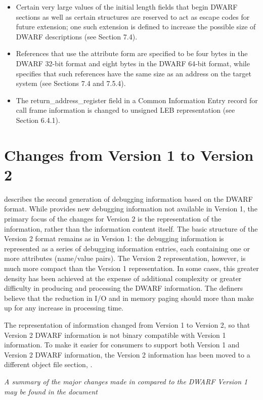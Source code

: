 \begin{itemize}
\item
Certain very large values of the initial length fields that
begin DWARF sections as well as certain structures are reserved
to act as escape codes for future extension; one such extension
is defined to increase the possible size of DWARF descriptions
(see Section 7.4).

\item
References that use the attribute form 
are specified to be four bytes in the DWARF 32-bit format and
eight bytes in the DWARF 64-bit format, while 
specifies that such references have the same size as an
address on the target system (see Sections 7.4 and 7.5.4).

\item
The return\_address\_register field in a Common Information
Entry record for call frame information is changed to unsigned
LEB representation (see Section 6.4.1).

\end{itemize}


\section[Changes Version1 to 2]{Changes from Version 1 to Version 2}
describes the second generation of debugging
information based on the DWARF format. While 
provides new debugging information not available in
Version 1, the primary focus of the changes for Version
2 is the representation of the information, rather than
the information content itself. The basic structure of
the Version 2 format remains as in Version 1: the debugging
information is represented as a series of debugging information
entries, each containing one or more attributes (name/value
pairs). The Version 2 representation, however, is much more
compact than the Version 1 representation. In some cases,
this greater density has been achieved at the expense of
additional complexity or greater difficulty in producing and
processing the DWARF information. The definers believe that the
reduction in I/O and in memory paging should more than make
up for any increase in processing time.  

The representation
of information changed from Version 1 to Version 2, so that
Version 2 DWARF information is not binary compatible with
Version 1 information. To make it easier for consumers to
support both Version 1 and Version 2 DWARF information, the
Version 2 information has been moved to a different object
file section, .  

\textit{
A summary of the major changes
made in 
compared to the DWARF Version 1 may
be found in the 
document
}

